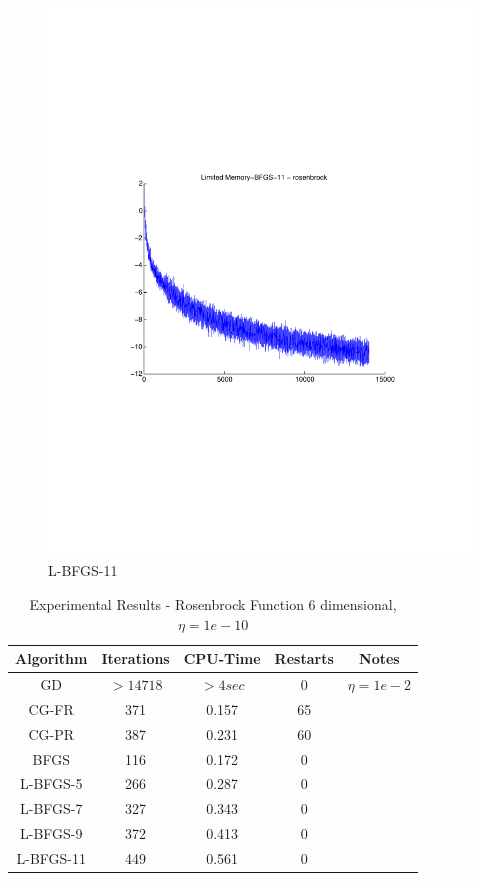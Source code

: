 \documentclass[12pt]{amsart}
\begin{document}
\begin{figure}[thpb]
\centering
\includegraphics[scale=0.60,clip=true,viewport=1in 3in 8in 8in]{images/rosenbrock-20/LBFGS11.pdf}
\caption{L-BFGS-11}
\label{fig:LBFGS11-rosen}
\end{figure}

\begin{table}
\caption{Experimental Results - Rosenbrock Function 6 dimensional, $\eta=1e-10$}
\label{results_rosenbrock_6}
\begin{center}
\begin{tabular}{|c||c||c||c||c|}
\hline
Algorithm & Iterations & CPU-Time & Restarts & Notes\\
\hline
GD & $>14718$ & $>4sec$ & 0 & $\eta=1e-2$\\
\hline
CG-FR & 371 & 0.157 & 65 & \\
\hline
CG-PR & 387 & 0.231 & 60 & \\
\hline
BFGS & 116 & 0.172 & 0 & \\
\hline
L-BFGS-5 & 266 & 0.287 & 0 &\\
\hline
L-BFGS-7 & 327 & 0.343 & 0 &\\
\hline
L-BFGS-9 & 372 & 0.413 & 0 &\\
\hline
L-BFGS-11 & 449 & 0.561 & 0 &\\
\hline
\end{tabular}
\end{center}
\end{table}
\end{document}
